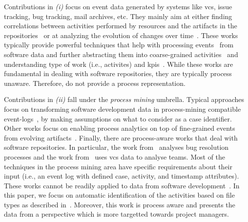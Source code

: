 Contributions in \textit{(i)} focus on event data generated by systems like \gls{vcs}, issue tracking, bug tracking, mail archives, etc. They mainly aim at either finding correlations between activities performed by resources and the artifacts in the repositories~\cite{DBLP:conf/iwpse/OlivaSGS11} or at analyzing the evolution of changes over time~\cite{DBLP:journals/tse/ZimmermannWDZ05}. These works typically provide powerful techniques that help with processing events~\cite{DBLP:conf/msr/0001W04} from software data and further abstracting them into coarse-grained activities~\cite{DBLP:conf/iwpse/OlivaSGS11,DBLP:conf/icst/ZaidmanRDD08,DBLP:conf/msr/RodriguezTK18} and 
 understanding type of work (i.e., activites) and \glspl{kpi}~\cite{DBLP:journals/ese/VasilescuSGM14,DBLP:conf/msr/JoonbakhshS18}.
While these works are fundamental in dealing with software repositories, they are typically process unaware. Therefore, do not provide a process representation.

Contributions in \textit{(ii)} fall under the \emph{process mining} umbrella. 
Typical approaches focus on transforming software development data in process-mining compatible event-logs~\cite{DBLP:conf/se/KindlerRS06,DBLP:conf/csmr/PoncinSB11}, by making assumptions on what to consider as a case identifier. Other works focus on enabling process analytics on top of fine-grained events from evolving artifacts~\cite{DBLP:conf/caise/BeheshtiBN13}. Finally, there are process-aware works that deal with software repositories. In particular, the work from~\cite{DBLP:conf/wecwis/MarquesSF18} analyses bug resolution processes and the work from~\cite{DBLP:conf/bpm/JookenCJ19} uses \gls{vcs} data to analyse teams. Most of the techniques in the process mining area have specific requirements about their input (i.e., an event log with defined case, activity, and timestamp attributes). These works cannot be readily applied to data from software development~\cite{DBLP:conf/er/TsourySR18}. 
In this paper, we focus on automatic identification of the activities based on file types as described in~\cite{DBLP:journals/ese/VasilescuSGM14}. Moreover, this work is process aware and presents the data from a perspective which is more targetted towards project managers.

